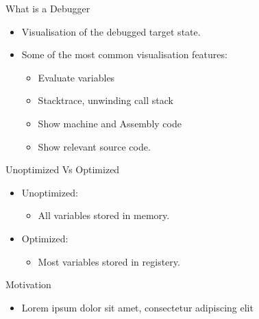 
\begin{frame}{What is a Debugger}
    \begin{itemize}
        \item Visualisation of the debugged target state.
        \item Some of the most common visualisation features:
    	\begin{itemize}
    	    \item Evaluate variables
    	    \item Stacktrace, unwinding call stack
    	    \item Show machine and Assembly code
    	    \item Show relevant source code.
    	\end{itemize}
    \end{itemize}
\end{frame}


\begin{frame}{Unoptimized Vs Optimized}
    \begin{itemize}
        \item Unoptimized:
    	\begin{itemize}
    	    \item All variables stored in memory.
    	\end{itemize}
        \item Optimized:
    	\begin{itemize}
    	    \item Most variables stored in registery.
    	\end{itemize}
    \end{itemize}
\end{frame}


\begin{frame}{Motivation}
    \begin{itemize}
        \item Lorem ipsum dolor sit amet, consectetur adipiscing elit
    \end{itemize}
\end{frame}


